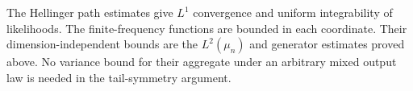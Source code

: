 The Hellinger path estimates give $L^1$ convergence and uniform
integrability of likelihoods.
The finite-frequency functions are bounded in each coordinate.
Their dimension-independent bounds are the $L^2(\mu_n)$ and generator
estimates proved above.
No variance bound for their aggregate under an arbitrary mixed output law is
needed in the tail-symmetry argument.
